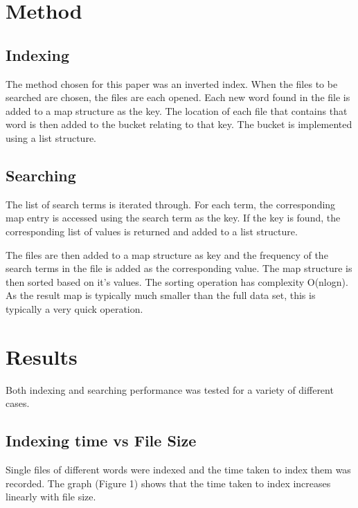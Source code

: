\documentclass[12pt, a4paper,oneside,twocolumn]{article}
\begin{document}
\section{Method}
\subsection{Indexing}
The method chosen for this paper was an inverted index. When the files to be searched are chosen, the files are each opened. Each new word found in the file is added to a map structure as the key. The location of each file that contains that word is then added to the bucket relating to that key. The bucket is implemented using a list structure. 

\subsection{Searching}
The list of search terms is iterated through. For each term,  the corresponding map entry is accessed using the search term as the key. If the key is found, the corresponding list of values is returned and added to a list structure. 

The files are then added to a map structure as key and the frequency of the search terms in the file is added as the corresponding value.
The map structure is then sorted based on it’s values. The sorting operation has complexity O(nlogn). As the result map is typically much smaller than the full data set, this is typically a very quick operation.

\section{Results}

Both indexing and searching performance was tested for a variety of different cases.

\subsection{Indexing time vs File Size}

Single files of different words were indexed and the time taken to index them was recorded. The graph (Figure 1) shows that the time taken to index increases linearly with file size.
\end{document}
